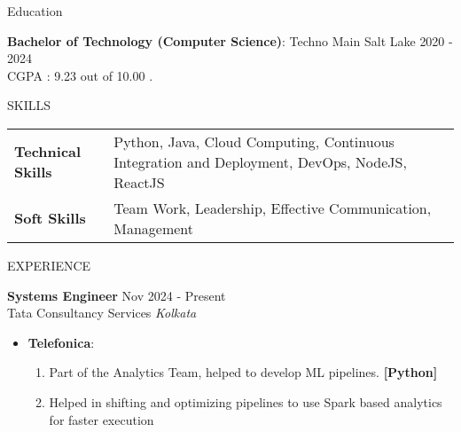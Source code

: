 \documentclass{resume} %
\begin{document}
\begin{rSection}{Education}

{\bf Bachelor of Technology (Computer Science)}: Techno Main Salt Lake \hfill {2020 - 2024}\\
CGPA : 9.23 out of 10.00 . 



\end{rSection}


\begin{rSection}{SKILLS}
\begin{tabularx}{\linewidth}{@{}l X@{}}
\textbf{Technical Skills} &  \normalsize{Python, Java, Cloud Computing, Continuous Integration and Deployment, DevOps, NodeJS, ReactJS}\\
\textbf{Soft Skills} &  \normalsize{Team Work, Leadership, Effective Communication, Management}\\
\end{tabularx}
\end{rSection}



\begin{rSection}{EXPERIENCE}

\textbf{Systems Engineer} \hfill Nov 2024 - Present\\
Tata Consultancy Services \hfill \textit{Kolkata}
 \begin{itemize}
    \itemsep -2pt {} 
     \item \textbf{Telefonica}: 
        \begin{enumerate}
        \itemsep -2pt
            \item Part of the Analytics Team, helped to develop ML pipelines. \textbf{[Python]}
            \item Helped in shifting and optimizing pipelines to use Spark based analytics for faster execution
        \end{enumerate}

 \end{itemize}



\end{rSection} 
\end{document}
